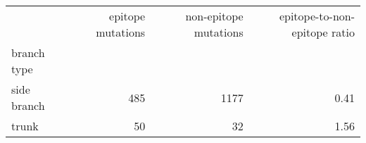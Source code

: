 \begin{tabular}{lrrr}
\toprule
{} &  epitope mutations &  non-epitope mutations &  epitope-to-non-epitope ratio \\
branch type &                    &                        &                               \\
\midrule
side branch &                485 &                   1177 &                          0.41 \\
trunk       &                 50 &                     32 &                          1.56 \\
\bottomrule
\end{tabular}
